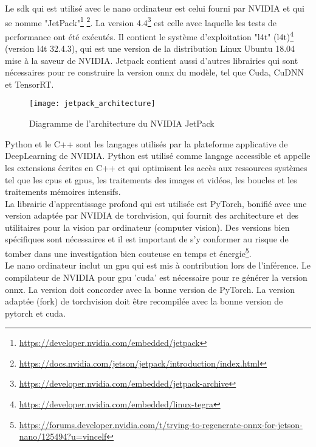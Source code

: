 \noindent Le \acrshort{sdk} qui est utilisé avec le nano ordinateur est celui fourni par NVIDIA et qui se nomme "JetPack"\footnote{\url{https://developer.nvidia.com/embedded/jetpack}} \footnote{\url{https://docs.nvidia.com/jetson/jetpack/introduction/index.html}}. La version 4.4\footnote{\url{https://developer.nvidia.com/embedded/jetpack-archive}} est celle avec laquelle les tests de performance ont été exécutés. Il contient le système d'exploitation "\acrlong{l4t}" (\acrshort{l4t})\footnote{\url{https://developer.nvidia.com/embedded/linux-tegra}} (version \acrshort{l4t} 32.4.3), qui est une version de la distribution Linux Ubuntu 18.04 mise à la saveur de NVIDIA. Jetpack contient aussi d'autres librairies qui sont nécessaires pour re construire la version \acrshort{onnx} du modèle, tel que Cuda, CuDNN et TensorRT.
\begin{figure}[H]
    \centering
    \texttt{[image: jetpack\_architecture]}
    \caption[Diagramme de l'architecture du NVIDIA JetPack]{Diagramme de l'architecture du NVIDIA JetPack\protect\footnotemark}
    \label{fig:jetpack_architecture}
\end{figure}
\noindent Python et le C++ sont les langages utilisés par la plateforme applicative de DeepLearning de NVIDIA. Python est utilisé comme langage accessible et appelle les extensions écrites en C++ et qui optimisent les accès aux ressources systèmes tel que les \acrshort{cpu}s et \acrshort{gpu}s, les traitements des images et vidéos, les boucles et les traitements mémoires intensifs.
\vspace{\baselineskip}
\\
\noindent La librairie d’apprentissage profond qui est utilisée est PyTorch, bonifié avec une version adaptée par NVIDIA de torchvision, qui fournit des architecture et des utilitaires pour la vision par ordinateur (computer vision). Des versions bien spécifiques sont nécessaires et il est important de s'y conformer au risque de tomber dans une investigation bien couteuse en temps et énergie\footnote{\url{https://forums.developer.nvidia.com/t/trying-to-regenerate-onnx-for-jetson-nano/125494?u=vincelf}}.
\vspace{\baselineskip}
\\
\noindent Le nano ordinateur inclut un \acrshort{gpu} qui est mis à contribution lors de l'inférence. Le compilateur de NVIDIA pour \acrshort{gpu} 'cuda' est nécessaire pour re générer la version \acrshort{onnx}. La version doit concorder avec la bonne version de PyTorch. La version adaptée (fork) de torchvision doit être recompilée avec la bonne version de pytorch et cuda. 
